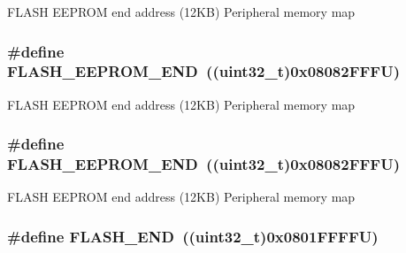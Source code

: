 F\-L\-A\-S\-H E\-E\-P\-R\-O\-M end address (12\-K\-B) Peripheral memory map \hypertarget{group___peripheral__memory__map_gac8cb9b66893a7c4bdff3258909af027a}{
\subsubsection[{F\-L\-A\-S\-H\-\_\-\-E\-E\-P\-R\-O\-M\-\_\-\-E\-N\-D}]{\setlength{\rightskip}{0pt plus 5cm}\#define F\-L\-A\-S\-H\-\_\-\-E\-E\-P\-R\-O\-M\-\_\-\-E\-N\-D~((uint32\-\_\-t)0x08082\-F\-F\-F\-U)}}\label{group___peripheral__memory__map_gac8cb9b66893a7c4bdff3258909af027a}
F\-L\-A\-S\-H E\-E\-P\-R\-O\-M end address (12\-K\-B) Peripheral memory map \hypertarget{group___peripheral__memory__map_gac8cb9b66893a7c4bdff3258909af027a}{
\subsubsection[{F\-L\-A\-S\-H\-\_\-\-E\-E\-P\-R\-O\-M\-\_\-\-E\-N\-D}]{\setlength{\rightskip}{0pt plus 5cm}\#define F\-L\-A\-S\-H\-\_\-\-E\-E\-P\-R\-O\-M\-\_\-\-E\-N\-D~((uint32\-\_\-t)0x08082\-F\-F\-F\-U)}}\label{group___peripheral__memory__map_gac8cb9b66893a7c4bdff3258909af027a}
F\-L\-A\-S\-H E\-E\-P\-R\-O\-M end address (12\-K\-B) Peripheral memory map \hypertarget{group___peripheral__memory__map_ga8be554f354e5aa65370f6db63d4f3ee4}{
\subsubsection[{F\-L\-A\-S\-H\-\_\-\-E\-N\-D}]{\setlength{\rightskip}{0pt plus 5cm}\#define F\-L\-A\-S\-H\-\_\-\-E\-N\-D~((uint32\-\_\-t)0x0801\-F\-F\-F\-F\-U)}}\label{group___peripheral__memory__map_ga8be554f354e5aa65370f6db63d4f3ee4}
